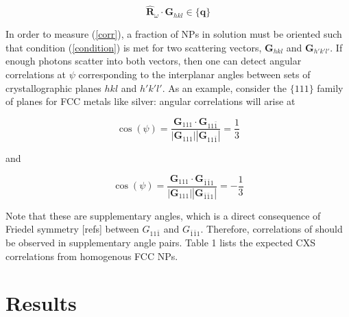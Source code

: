 \documentclass [11pt,fleqn]{article}
\def \be {\begin{equation}}
\def \ee {\end{equation}}
\begin{document}
\be \label{condition}
\hat{\bm R}_\omega \cdot \bm G_{hkl} \in \{\bm q\}
\ee

In order to measure (\ref{corr}), a fraction of NPs in solution must be oriented such that condition (\ref{condition}) is met for two scattering vectors, $\bm G_{hkl}$ and $\bm G_{h'k'l'}$. If enough photons scatter into both vectors, then one can detect angular correlations at $\psi$ corresponding to the interplanar angles between sets of crystallographic planes $hkl$ and $h'k'l'$. As an example, consider the $\{111\}$ family of planes for FCC metals like silver: angular correlations will arise at

\be
\cos (\psi) = \frac{\bm G_{111} \cdot \bm G_{11\bar{1}}}{|\bm G_{111}| |\bm G_{11\bar{1}}| } = \frac{1}{3}
\ee

and

\be
\cos (\psi) = \frac{\bm G_{111} \cdot \bm G_{\bar{1}\bar{1}1}}{|\bm G_{111}| |\bm G_{\bar{1}\bar{1}1}| } = -\frac{1}{3}
\ee

Note that these are supplementary angles, which is a direct consequence of Friedel symmetry [refs] between $G_{11\bar{1}}$ and $G_{\bar{1}\bar{1}1}$. Therefore, correlations of should be observed in supplementary angle pairs.  Table 1 lists the expected CXS correlations from homogenous FCC NPs.

\section{Results}








\end{document}
